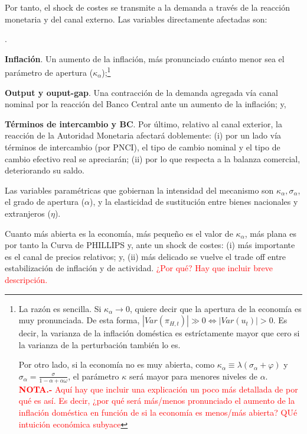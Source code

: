 \documentclass[10pt,a4paper]{article}
\newcounter{numitem}
\newenvironment{lnum}
      {\begin{list}{\arabic{numitem}.}{%
          \usecounter{numitem}%
          \setlength{\leftmargin}{1cm}%
          \setlength{\parskip}{3pt}%
          \setlength{\itemsep}{0pt}%
          \setlength{\parsep}{0pt}%
      }}
      {\end{list}}
\begin{document}
Por tanto, el shock de costes se transmite a la demanda a través de la reacción monetaria y del canal externo. Las variables directamente afectadas son:
\begin{lnum}
    \item \textbf{Inflación}. Un aumento de la inflación, más pronunciado cuánto menor sea el parámetro de apertura ($\kappa_\alpha$);\footnote{
      La razón es sencilla. Si $\kappa_\alpha\to0$, quiere decir que la apertura de la economía es muy pronunciada. De esta forma, $|Var(\pi_{H,t})|\gg0\iff |Var(u_t)|>0$. Es decir, la varianza de la inflación doméstica es estríctamente mayor que cero si la varianza de la perturbación también lo es. 
    
    Por otro lado, si la economía no es muy abierta, como $\kappa_\alpha\equiv \lambda(\sigma_\alpha+\varphi)$ y $\sigma_\alpha=\frac{\sigma}{1-\alpha+\alpha\omega}$, el parámetro $\kappa$ será mayor para menores niveles de $\alpha$. \textcolor{red}{\textbf{NOTA.-} Aquí hay que incluir una explicación un poco más detallada de por qué es así. Es decir, ¿por qué será más/menos pronunciado el aumento de la inflación doméstica en función de si la economía es menos/más abierta? QUé intuición económica subyace}
    }
    \item \textbf{Output y ouput-gap}. Una contracción de la demanda agregada vía canal nominal por la reacción del Banco Central ante un aumento de la inflación; y,
    \item \textbf{Términos de intercambio y BC}. Por último, relativo al canal exterior, la reacción de la Autoridad Monetaria afectará doblemente: (i) por un lado vía términos de intercambio (por PNCI), el tipo de cambio nominal y el tipo de cambio efectivo real se apreciarán; (ii) por lo que respecta a la balanza comercial, deteriorando su saldo. 
\end{lnum}

Las variables paramétricas que gobiernan la intensidad del mecanismo son $\kappa_\alpha, \sigma_\alpha$, el grado de apertura ($\alpha$), y la elasticidad de sustitución entre bienes nacionales y extranjeros ($\eta$). 

Cuanto más abierta es la economía, más pequeño es el valor de $\kappa_\alpha$, más plana es por tanto la Curva de PHILLIPS y, ante un shock de costes: (i) más importante es el canal de precios relativos; y, (ii) más delicado se vuelve el trade off entre estabilización de inflación y de actividad. \textcolor{red}{¿Por qué? Hay que incluir breve descripción. }
\end{document}
